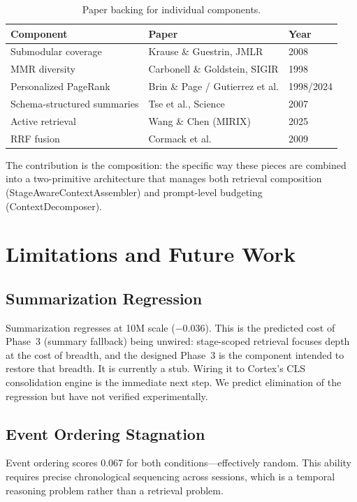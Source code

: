 \documentclass[11pt]{article}
\begin{document}
\begin{table}[h]
\centering
\caption{Paper backing for individual components.}
\label{tab:paper-backing}
\begin{tabular}{lll}
\toprule
Component & Paper & Year \\
\midrule
Submodular coverage & Krause \& Guestrin, JMLR & 2008 \\
MMR diversity & Carbonell \& Goldstein, SIGIR & 1998 \\
Personalized PageRank & Brin \& Page / Gutierrez et al. & 1998/2024 \\
Schema-structured summaries & Tse et al., Science & 2007 \\
Active retrieval & Wang \& Chen (MIRIX) & 2025 \\
RRF fusion & Cormack et al. & 2009 \\
\bottomrule
\end{tabular}
\end{table}

The contribution is the composition: the specific way these pieces
are combined into a two-primitive architecture that manages both
retrieval composition (StageAwareContextAssembler) and prompt-level
budgeting (ContextDecomposer).

\section{Limitations and Future Work}
\label{sec:limitations}

\subsection{Summarization Regression}

Summarization regresses at 10M scale ($-0.036$).  This is the
predicted cost of Phase~3 (summary fallback) being unwired: stage-scoped
retrieval focuses depth at the cost of breadth, and the designed Phase~3
is the component intended to restore that breadth.  It is currently a
stub.  Wiring it to Cortex's CLS consolidation engine is the immediate
next step.  We predict elimination of the regression but have not
verified experimentally.

\subsection{Event Ordering Stagnation}

Event ordering scores 0.067 for both conditions---effectively random.
This ability requires precise chronological sequencing across
sessions, which is a temporal reasoning problem rather than a
retrieval problem.
\end{document}
